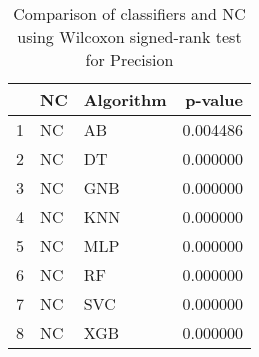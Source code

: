 \begin{table}
\footnotesize
\caption{Comparison of classifiers and NC using Wilcoxon signed-rank test for Precision}
\label{tab:NC wilcoxon Precision comparison}
\begin{tabular}{lllr}
\hline
 & NC & Algorithm & p-value \\
\hline
1 & NC & AB & 0.004486 \\
2 & NC & DT & 0.000000 \\
3 & NC & GNB & 0.000000 \\
4 & NC & KNN & 0.000000 \\
5 & NC & MLP & 0.000000 \\
6 & NC & RF & 0.000000 \\
7 & NC & SVC & 0.000000 \\
8 & NC & XGB & 0.000000 \\
\hline
\end{tabular}
\end{table}
